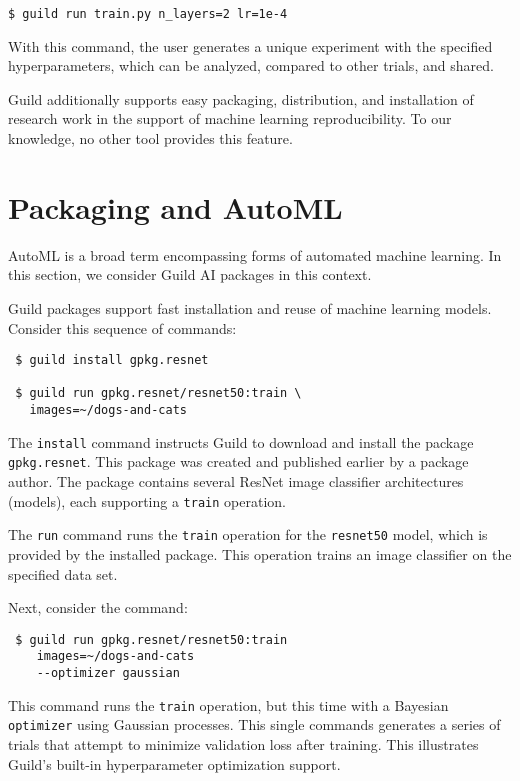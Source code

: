 \documentclass{article}
\begin{document}
{\footnotesize
\begin{verbatim}
$ guild run train.py n_layers=2 lr=1e-4
\end{verbatim}}

With this command, the user generates a unique experiment with the
specified hyperparameters, which can be analyzed, compared to other
trials, and shared.

Guild additionally supports easy packaging, distribution, and
installation of research work in the support of machine learning
reproducibility. To our knowledge, no other tool provides this
feature.

\section{Packaging and AutoML}

AutoML is a broad term encompassing forms of automated machine
learning. In this section, we consider Guild AI packages in this
context.

Guild packages support fast installation and reuse of machine learning
models. Consider this sequence of commands:

{\footnotesize
\begin{verbatim}
 $ guild install gpkg.resnet

 $ guild run gpkg.resnet/resnet50:train \
   images=~/dogs-and-cats
\end{verbatim}}

The \texttt{install} command instructs Guild to download and install
the package \texttt{gpkg.resnet}. This package was created and
published earlier by a package author. The package contains several
ResNet image classifier architectures (models), each supporting a
\texttt{train} operation.

The \texttt{run} command runs the \texttt{train} operation for the
\texttt{resnet50} model, which is provided by the installed
package. This operation trains an image classifier on the specified
data set.

Next, consider the command:

{\footnotesize
\begin{verbatim}
 $ guild run gpkg.resnet/resnet50:train
    images=~/dogs-and-cats
    --optimizer gaussian
\end{verbatim}}

This command runs the \texttt{train} operation, but this time with a
Bayesian \texttt{optimizer} using Gaussian processes. This single
commands generates a series of trials that attempt to minimize
validation loss after training. This illustrates Guild's built-in
hyperparameter optimization support.
\end{document}
